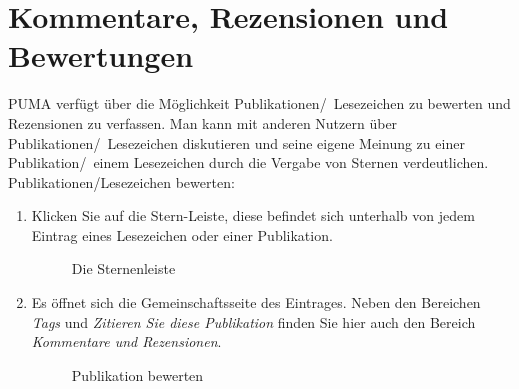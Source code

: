 \section{Kommentare, Rezensionen und Bewertungen}
PUMA verfügt über die Möglichkeit Publikationen/~Lesezeichen zu bewerten und Rezensionen zu verfassen. Man kann mit anderen Nutzern über Publikationen/~Lesezeichen diskutieren und seine eigene Meinung zu einer Publikation/~einem Lesezeichen durch die Vergabe von Sternen verdeutlichen.
\newline
\newline
Publikationen/Lesezeichen bewerten:
\begin{enumerate}
    \item Klicken Sie auf die Stern-Leiste, diese befindet sich unterhalb von jedem Eintrag eines Lesezeichen oder einer Publikation.
\begin{figure}[h!]
 \centering
 \caption{Die Sternenleiste}
 \label{figure066}
\end{figure}  
    \item Es öffnet sich die Gemeinschaftsseite des Eintrages. Neben den Bereichen \textit{Tags} und \textit{Zitieren Sie diese Publikation} finden Sie hier auch den Bereich \textit{Kommentare und Rezensionen}. 
\begin{figure}[h!]
 \centering
 \caption{Publikation bewerten}
 \label{figure067}
\end{figure}
    \begin{itemize} 

\end{itemize}
\end{enumerate}
